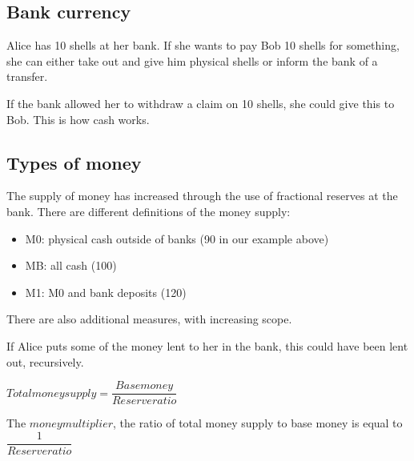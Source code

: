 
\subsection{Bank currency}

Alice has 10 shells at her bank. If she wants to pay Bob 10 shells for something, she can either take out and give him physical shells or inform the bank of a transfer.

If the bank allowed her to withdraw a claim on 10 shells, she could give this to Bob. This is how cash works.

\subsection{Types of money}

The supply of money has increased through the use of fractional reserves at the bank. There are different definitions of the money supply:

\begin{itemize}
\item M0: physical cash outside of banks (90 in our example above)
\item MB: all cash (100)
\item M1: M0 and bank deposits (120)
\end{itemize}

There are also additional measures, with increasing scope.

If Alice puts some of the money lent to her in the bank, this could have been lent out, recursively.

\(Total money supply = \dfrac{Base money}{Reserve ratio}\)

The \(money multiplier\), the ratio of total money supply to base money is equal to \(\dfrac{1}{Reserve ratio}\)

